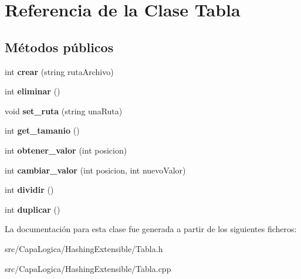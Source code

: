 \hypertarget{class_tabla}{\section{\-Referencia de la \-Clase \-Tabla}
\label{class_tabla}
}
\subsection*{\-Métodos públicos}
\begin{DoxyCompactItemize}
\item 
\hypertarget{class_tabla_abaae11c213eae93fe7618a0dce76b356}{int {\bfseries crear} (string ruta\-Archivo)}\label{class_tabla_abaae11c213eae93fe7618a0dce76b356}

\item 
\hypertarget{class_tabla_ab6802c40bdb0d1ee8057639dd9b6f336}{int {\bfseries eliminar} ()}\label{class_tabla_ab6802c40bdb0d1ee8057639dd9b6f336}

\item 
\hypertarget{class_tabla_ad1cdad2a93bc17acd6f2ae8912c11b8a}{void {\bfseries set\-\_\-ruta} (string una\-Ruta)}\label{class_tabla_ad1cdad2a93bc17acd6f2ae8912c11b8a}

\item 
\hypertarget{class_tabla_af98956b1242550346861e4cf6858005c}{int {\bfseries get\-\_\-tamanio} ()}\label{class_tabla_af98956b1242550346861e4cf6858005c}

\item 
\hypertarget{class_tabla_ae897cab0dafae1aab287418f7877621f}{int {\bfseries obtener\-\_\-valor} (int posicion)}\label{class_tabla_ae897cab0dafae1aab287418f7877621f}

\item 
\hypertarget{class_tabla_ad4c4a5c4715c5868170edd86b71b642b}{int {\bfseries cambiar\-\_\-valor} (int posicion, int nuevo\-Valor)}\label{class_tabla_ad4c4a5c4715c5868170edd86b71b642b}

\item 
\hypertarget{class_tabla_ae3f9d81cd04d2abbff233211608f33d5}{int {\bfseries dividir} ()}\label{class_tabla_ae3f9d81cd04d2abbff233211608f33d5}

\item 
\hypertarget{class_tabla_ae2d3b1aadf07dfe8d147f1c01436d7a2}{int {\bfseries duplicar} ()}\label{class_tabla_ae2d3b1aadf07dfe8d147f1c01436d7a2}

\end{DoxyCompactItemize}


\-La documentación para esta clase fue generada a partir de los siguientes ficheros\-:\begin{DoxyCompactItemize}
\item 
src/\-Capa\-Logica/\-Hashing\-Extensible/\-Tabla.\-h\item 
src/\-Capa\-Logica/\-Hashing\-Extensible/\-Tabla.\-cpp\end{DoxyCompactItemize}
